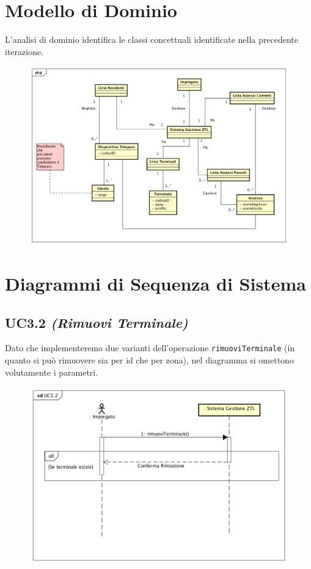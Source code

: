 \documentclass[12pt, letterpaper]{article}
\begin{document}
\section{Modello di Dominio}
L'analisi di dominio identifica le classi 
concettuali identificate nella precedente
iterazione. 
\begin{figure}[H]
    \centering
    \includegraphics[scale=0.40]{ModelloDominio}
    \label{fig:mesh1}
\end{figure}

\section{Diagrammi di Sequenza di Sistema}

\subsection{UC3.2 \emph{(Rimuovi Terminale)}}
Dato che implementeremo due varianti
dell'operazione \texttt{rimuoviTerminale}
(in quanto si può rimuovere sia per id che 
per zona), nel diagramma si omettono 
volutamente i parametri.
\begin{figure}[H]
    \centering
    \includegraphics[scale=0.40]{UC3.2-SSD}
    \label{fig:mesh1}
\end{figure}
\end{document}
